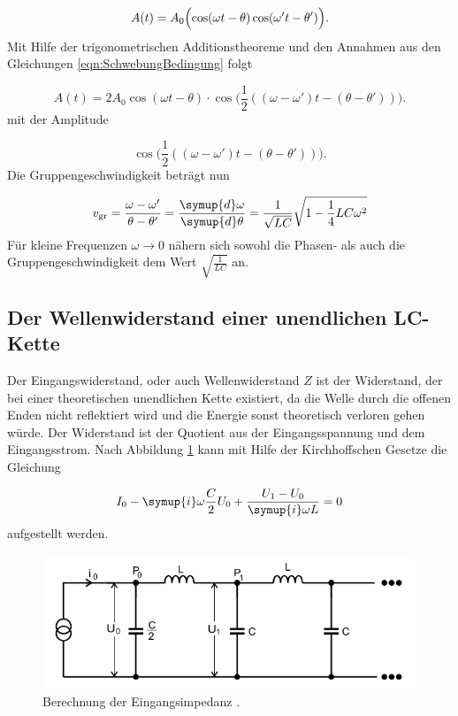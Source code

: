 \begin{equation}
  A(t) = A_0 \Bigl(\cos(\omega t - \theta) \cos(\omega' t - \theta')\Bigr).
\end{equation}
Mit Hilfe der trigonometrischen Additionstheoreme und den Annahmen aus den
Gleichungen \eqref{eqn:SchwebungBedingung} folgt

\begin{equation}
  A(t) = 2 A_0 \cos(\omega t - \theta) \cdot \cos \Bigr(\frac{1}{2}
  ((\omega-\omega')t-(\theta-\theta'))\Bigr).
\end{equation}
mit der Amplitude

\begin{equation}
  \cos \Bigr(\frac{1}{2}
  ((\omega-\omega')t-(\theta-\theta'))\Bigr).
\end{equation}
Die Gruppengeschwindigkeit beträgt nun

\begin{equation}
  v_\text{gr} = \frac{\omega - \omega'}{\theta - \theta'} =
  \frac{\symup{d}\omega}{\symup{d}\theta} =
  \frac{1}{\sqrt{LC}}\sqrt{1 - \frac{1}{4}LC\omega^2}
\end{equation}
Für kleine Frequenzen $\omega \to 0$ nähern sich sowohl die Phasen- als auch
die Gruppengeschwindigkeit dem Wert $\sqrt{\frac{1}{LC}}$ an.


\subsection{Der Wellenwiderstand einer unendlichen LC-Kette}

Der Eingangswiderstand, oder auch Wellenwiderstand $Z$ ist der Widerstand, der
bei einer theoretischen unendlichen Kette existiert, da die Welle durch die
offenen Enden nicht reflektiert wird und die Energie sonst theoretisch
verloren gehen würde.
Der Widerstand ist der Quotient aus der Eingangsspannung und dem Eingangsstrom.
Nach Abbildung \ref{fig:WW} kann mit Hilfe der Kirchhoffschen Gesetze die
Gleichung

\begin{equation}
  I_0 - \symup{i}\omega \frac{C}{2} U_0 + \frac{U_1 - U_0}{\symup{i}\omega L}=0
  \label{eqn:Eingang}
\end{equation}
aufgestellt werden.

\begin{figure}
  \centering
  \includegraphics[height = 4cm]{Wellenwiderstand.png}
  \caption{Berechnung der Eingangsimpedanz \cite{anleitung}.}
  \label{fig:WW}
\end{figure}

